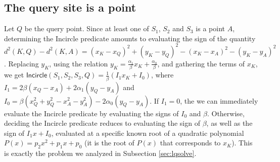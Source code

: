 \documentclass[letterpaper,11pt]{article}
\newcommand{\incircle}{\textsf{Incircle}\xspace}
\newcommand{\pps}{$PPS$\xspace}
\newcommand{\pss}{$PSS$\xspace}
\begin{document}
\subsection{The query site is a point}\label{sec:pxsp}

Let $Q$ be the query point. Since at least one of $S_1$, $S_2$ and
$S_3$ is a point $A$, determining the \incircle predicate amounts to
evaluating the sign of the quantity
$d^2(K,Q)-d^2(K,A)=(x_K-x_Q)^2+(y_K-y_Q)^2-(x_K-x_A)^2-(y_K-y_A)^2$.
Replacing $y_K$, using the relation
$y_K=\frac{\alpha_1}{\beta}x_K+\frac{\alpha_0}{\beta}$, and gathering
the terms of $x_K$, we get
$\incircle(S_1,S_2,S_3,Q)=\frac{1}{\beta}(I_1x_K+I_0)$, where
$I_1=2\beta(x_Q-x_A)+2\alpha_1(y_Q-y_A)$ and
$I_0=\beta(x_Q^2+y_Q^2-x_A^2-y_A^2)-2\alpha_0(y_Q-y_A)$.
If $I_1=0$, the we can immediately evaluate the \incircle predicate by
evaluating the signs of $I_0$ and $\beta$. Otherwise, deciding the
\incircle predicate reduces to evaluating the sign of $\beta$, as well
as the sign of $I_1x+I_0$, evaluated at a specific known root of a
quadratic polynomial $P(x)=p_2x^2+p_1x+p_0$ (it is the root of $P(x)$
that corresponds to $x_K$). This is exactly the problem we analyzed in
Subsection \ref{sec:lqsolve}.

\begin{comment}
with roots $x_1\le{}x_2$ (this happens in the
\pps and \pss cases), evaluating the sign
of $I_1x_K+I_0$ amounts to evaluating the signs of $P(x^\star)$ and
$P'(x^\star)$, where $x^\star=-\frac{I_0}{I_1}$.
If $sign(P(x^\star))=-sign(p_2)$, we have
$x^\star\in(x_1,x_2)$, otherwise, if $sign(P(x^\star))=sign(p_2)$
(resp., $sign(P(x^\star))=0$), we have to check the sign of
$P'(x^\star)=2p_2x^\star+p_1$. 
If $sign(P'(x^\star))=-sign(p_2)$, we get $x^\star<x_1,x_2$
(resp. $x^\star=x_1$), while if $sign(P'(x^\star))=sign(p_2)$, we get
$x^\star>x_1,x_2$ (resp. $x^\star=x_2$).  

The signs of $P(x^\star)$ and $P'(x^\star)$ are equal to
\begin{equation*}
  sign(P(x^\star))=sign(p_2I_0^2-p_1 I_1 I_0+p_0I_1^2)
\end{equation*}
and 
\begin{equation*}
  sign(P'(x^\star))=sign(-2p_2 I_0 +p_1 I_1)sign(I_1)
\end{equation*}
\end{comment}
\end{document}
